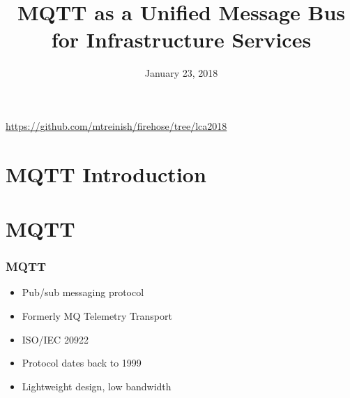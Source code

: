 \documentclass[aspectratio=169,11pt,hyperref={colorlinks=true}]{beamer}
\author[Matthew Treinish & Jeremy Stanley]{%
    \texorpdfstring{%
        \begin{columns}
            \column{.45\linewidth}
            \centering
            Matthew Treinish\\
            Open Source Developer Advocate - IBM\\
            \href{mailto:mtreinish@kortar.org}{mtreinish@kortar.org}\\
        \texttt{mtreinish on Freenode}
        \column{.45\linewidth}
            \centering
            Jeremy Stanley\\
            \href{mailto:fungi@yuggoth.org}{fungi@yuggoth.org}\\
            \texttt{fungi on Freenode}
        \end{columns}
        }
    {Matthew Treinish & Jeremy Stanley}
}
\date{January 23, 2018}
\title[MQTT as a Unified Message Bus for Infrastructure Services
\hspace{2em}\insertframenumber/\inserttotalframenumber]{MQTT as a Unified Message Bus for Infrastructure Services}
\begin{document}
{%
\begin{frame}[noframenumbering]
    \hypersetup{colorlinks,urlcolor=white}
    \titlepage{}
    \centering
    \href{https://github.com/mtreinish/firehose/tree/lca2018}{https://github.com/mtreinish/firehose/tree/lca2018}
\end{frame}
}

\section{MQTT Introduction}

\section{MQTT}
\begin{frame}
	\frametitle{MQTT}
    \begin{itemize}
        \item Pub/sub messaging protocol
        \item Formerly MQ Telemetry Transport
        \item ISO/IEC 20922
        \item Protocol dates back to 1999
        \item Lightweight design, low bandwidth
    \end{itemize}
\end{frame}
\end{document}
